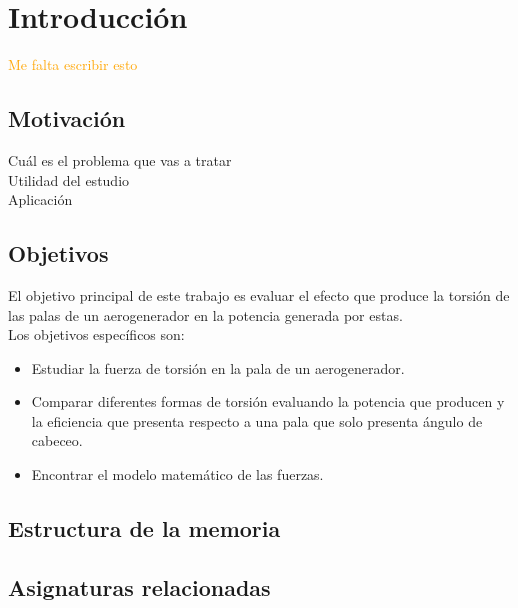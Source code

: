 \section{Introducción}
\textcolor{orange}{\huge Me falta escribir esto}
\subsection{Motivación}

Cuál es el problema que vas a tratar\\
Utilidad del estudio\\
Aplicación\\

\subsection{Objetivos}
El objetivo principal de este trabajo es evaluar el efecto que produce la torsión de las palas de un aerogenerador en la potencia generada por estas.\\

Los objetivos específicos son:
\begin{itemize}
    \item Estudiar la fuerza de torsión en la pala de un aerogenerador.
    \item Comparar diferentes formas de torsión evaluando la potencia que producen y la eficiencia que presenta respecto a una pala que solo presenta ángulo de cabeceo.
    \item Encontrar el modelo matemático de las fuerzas.
\end{itemize}

\subsection{Estructura de la memoria}

\subsection{Asignaturas relacionadas}